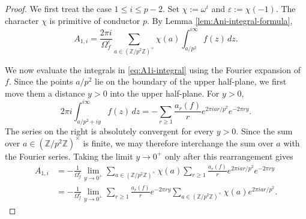 \documentclass[10pt,a4paper]{amsart}
\newcommand{\Z}{\mathbb{Z}}
\begin{document}
\begin{proof}
We first treat the case \(1\leq i\leq p-2\). Set $\chi:=\omega^i$ and $\varepsilon:=\chi(-1)$. The character \(\chi\) is primitive of conductor \(p\). By Lemma \ref{lem:Ani-integral-formula},
\begin{equation}
\label{eq:A1i-integral}
        A_{1,i}
        =
        \frac{2\pi i}{\Omega_f^\varepsilon}
        \sum_{a\in(\Z/p^2\Z)^\times}
        \chi(a)
        \int_{a/p^2}^{i\infty}f(z)\,dz.
\end{equation}

We now evaluate the integrals in \eqref{eq:A1i-integral} using the
Fourier expansion of \(f\).  Since the points \(a/p^2\) lie on the
boundary of the upper half-plane, we first move them a distance
\(y>0\) into the upper half-plane.  For \(y>0\),
\[
        2\pi i
        \int_{a/p^2+iy}^{i\infty}f(z)\,dz
        =
        -\sum_{r\geq1}
        \frac{a_r(f)}{r}
        e^{2\pi i ar/p^2}e^{-2\pi ry}.
\]
The series on the right is absolutely convergent for every \(y>0\).
Since the sum over \(a\in(\Z/p^2\Z)^\times\) is finite, we may
therefore interchange the sum over \(a\) with the Fourier series.
Taking the limit \(y\to0^+\) only after this rearrangement gives
\[
\begin{aligned}
        A_{1,i}
        &=
        -\frac1{\Omega_f^\varepsilon}
        \lim_{y\to0^+}
        \sum_{a\in(\Z/p^2\Z)^\times}
        \chi(a)
        \sum_{r\geq1}
        \frac{a_r(f)}{r}
        e^{2\pi i ar/p^2}e^{-2\pi ry}             \\
        &=
        -\frac1{\Omega_f^\varepsilon}
        \lim_{y\to0^+}
        \sum_{r\geq1}
        \frac{a_r(f)}{r}e^{-2\pi ry}
        \sum_{a\in(\Z/p^2\Z)^\times}
        \chi(a)e^{2\pi i ar/p^2}.
\end{aligned}
\]


\end{proof}
\end{document}
